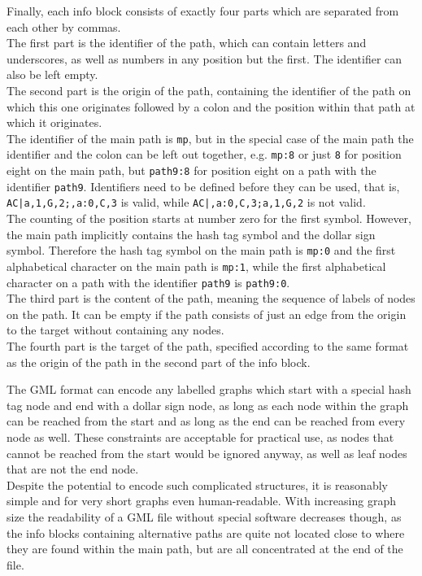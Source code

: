 \documentclass[a4paper,12pt,twoside,BCOR=10mm]{scrbook}
\begin{document}
Finally, each info block consists of exactly four parts which are separated from each other by commas. \\
The first part is the identifier of the path, which can contain letters and underscores,
as well as numbers in any position but the first.
The identifier can also be left empty. \\
The second part is the origin of the path,
containing the identifier of the path on which this one
originates followed by a colon and the position within that path
at which it originates. \\
The identifier of the main path is \texttt{mp}, but in the special case of the main path the
identifier and the colon can be left out together, e.g. \texttt{mp:8} or just \texttt{8} for position eight
on the main path, but \texttt{path9:8} for position eight on a path with the identifier \texttt{path9}.
Identifiers need to be defined before they can be used, that
is, \texttt{AC|a,1,G,2;,a:0,C,3} is valid, while \texttt{AC|,a:0,C,3;a,1,G,2} is not valid. \\
The counting of the position starts at number zero for the first symbol.
However, the main path implicitly contains the hash tag symbol and the dollar sign symbol.
Therefore the hash tag symbol on the main path is \texttt{mp:0} and
the first alphabetical character on the main path is \texttt{mp:1},
while the first alphabetical character on a path with the identifier \texttt{path9} is \texttt{path9:0}. \\
The third part is the content of the path, meaning the sequence of labels of nodes on the path.
It can be empty if the path consists of just an edge from the origin to the target without containing any nodes. \\
The fourth part is the target of the path,
specified according to the same format as the origin of the path in the second part of the info block.

The GML format can encode any labelled graphs which start with a special hash tag node
and end with a dollar sign node, as long as each node within the graph
can be reached from the start and as long as the end can be reached from
every node as well. These constraints are acceptable for practical use,
as nodes that cannot be reached from the start would be ignored anyway,
as well as leaf nodes that are not the end node. \\
Despite the potential to encode such complicated structures, it is reasonably
simple and for very short graphs even human-readable.
With increasing graph size the readability of a GML file without special software
decreases though, as the info blocks containing alternative paths are quite not
located close to where they are found within the main path, but are all concentrated at the end of the file.
\end{document}
